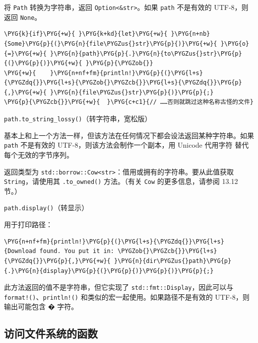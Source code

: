 将 \texttt{Path} 转换为字符串，返回 \texttt{Option<\&str>}。如果 \texttt{path} 不是有效的 UTF-8，则返回 \texttt{None}。

\begin{Verbatim}[commandchars=\\\{\},breaklines=true,breakanywhere=true,fontsize=\codefont,xleftmargin=17bp]
\PYG{k}{if}\PYG{+w}{ }\PYG{k+kd}{let}\PYG{+w}{ }\PYG{n+nb}{Some}\PYG{p}{(}\PYG{n}{file\PYGZus{}str}\PYG{p}{)}\PYG{+w}{ }\PYG{o}{=}\PYG{+w}{ }\PYG{n}{path}\PYG{p}{.}\PYG{n}{to\PYGZus{}str}\PYG{p}{(}\PYG{p}{)}\PYG{+w}{ }\PYG{p}{\PYGZob{}}
\PYG{+w}{    }\PYG{n+nf+fm}{println!}\PYG{p}{(}\PYG{l+s}{\PYGZdq{}}\PYG{l+s}{\PYGZob{}\PYGZcb{}}\PYG{l+s}{\PYGZdq{}}\PYG{p}{,}\PYG{+w}{ }\PYG{n}{file\PYGZus{}str}\PYG{p}{)}\PYG{p}{;}
\PYG{p}{\PYGZcb{}}\PYG{+w}{  }\PYG{c+c1}{// ……否则就跳过这种名称古怪的文件}
\end{Verbatim}

\begin{myNote}
\texttt{path.to\_string\_lossy()}（转字符串，宽松版）
\end{myNote}

基本上和上一个方法一样，但该方法在任何情况下都会设法返回某种字符串。如果 \texttt{path} 不是有效的 UTF-8，则该方法会制作一个副本，用 Unicode 代用字符  替代每个无效的字节序列。

返回类型为 \texttt{std::borrow::Cow<str>}：借用或拥有的字符串。要从此值获取 \texttt{String}，请使用其 \texttt{.to\_owned()} 方法。（有关 \texttt{Cow} 的更多信息，请参阅 13.12 节。）

\begin{mySidenote}
\texttt{path.display()}（转显示）
\end{mySidenote}

用于打印路径：

\begin{Verbatim}[commandchars=\\\{\},breaklines=true,breakanywhere=true,fontsize=\codefont,xleftmargin=17bp]
\PYG{n+nf+fm}{println!}\PYG{p}{(}\PYG{l+s}{\PYGZdq{}}\PYG{l+s}{Download found. You put it in: \PYGZob{}\PYGZcb{}}\PYG{l+s}{\PYGZdq{}}\PYG{p}{,}\PYG{+w}{ }\PYG{n}{dir\PYGZus{}path}\PYG{p}{.}\PYG{n}{display}\PYG{p}{(}\PYG{p}{)}\PYG{p}{)}\PYG{p}{;}
\end{Verbatim}

此方法返回的值不是字符串，但它实现了 \texttt{std::fmt::Display}，因此可以与 \texttt{format!()}、\texttt{println!()} 和类似的宏一起使用。如果路径不是有效的 UTF-8，则输出可能包含 � 字符。

\subsection{访问文件系统的函数}

